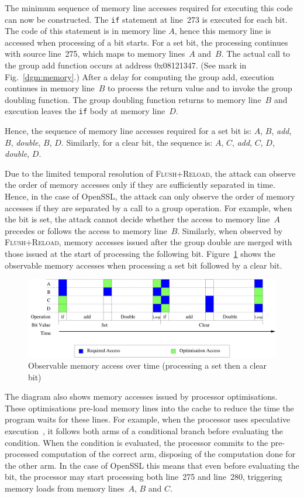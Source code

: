 \documentclass[twocolumn]{svjour3}
\newcommand{\fl}{\textsc{Flu\-sh+\allowbreak Re\-load}\xspace}
\begin{document}
The minimum sequence of memory line accesses required for executing this code can now be constructed.
The \texttt{if} statement at line~273 is executed for each bit.  
The code of this statement is in memory line $A$, hence this memory line is accessed when processing of a bit starts.
For a set bit, the processing continues with source line~275, which maps to memory lines~$A$ and~$B$.
The actual call to the group add function occurs at address 0x08121347.
(See mark in Fig.~\ref{dgm:memory}.)
After a delay for computing the group add, execution continues in memory line~$B$ to process the return value and 
to invoke the group doubling function.
The group doubling function returns to memory line~$B$ and execution leaves the \texttt{if} body at memory line~$D$.

Hence, the sequence of memory line accesses required for a set bit is: $A$, $B$, \textit{add}, $B$, \textit{double}, $B$, $D$.
Similarly, for a clear bit, the sequence is: $A$, $C$, \textit{add}, $C$, $D$, \textit{double}, $D$.

Due to the limited temporal resolution of \fl, the attack can observe the order of memory accesses only
if they are sufficiently separated in time.
Hence, in the case of OpenSSL, the attack can only observe the order of memory accesses if they are separated by a call
to a group operation.
For example, when the bit is set, the attack cannot decide whether the access to memory line~$A$ precedes or follows the access
to memory line~$B$.
Similarly, when observed by \fl, memory accesses issued after the group double are merged with those 
issued at the start of processing the following bit.
Figure~\ref{dgm:temporal} shows the observable memory accesses when processing a set bit followed by
a clear bit.

\begin{figure}[htb]
\centering\includegraphics[width=\columnwidth]{images/temporal}
\caption{Observable memory access over time (processing a set then  a clear bit)\label{dgm:temporal}}
\end{figure}

The diagram also shows memory accesses issued by processor optimisations.
These optimisations pre-load memory lines into the cache to reduce the time the program waits for these lines.
For example, when the processor uses speculative execution~\cite{uht95disjoint}, it follows both arms of a conditional
branch before evaluating the condition.
When the condition is evaluated, the processor commits to the pre-processed computation of the correct arm,
disposing of the computation done for the other arm. 
In the case of OpenSSL this means that even before evaluating the bit, 
the processor may start processing both line~275 and line~280, triggering memory loads from memory lines~$A$, $B$ and $C$.
\end{document}
